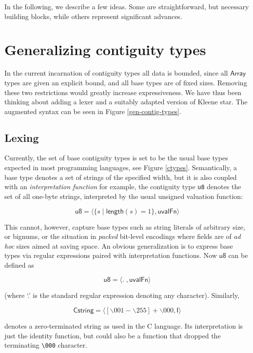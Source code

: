 \documentclass{article}
\newcommand{\konst}[1]{\ensuremath{\mathsf{#1}}}
\newcommand{\set}[1]{\ensuremath{\{ {#1} \}}}
\theoremstyle{definition}
\begin{document}
In the following, we describe a few ideas. Some are straightforward,
but necessary building blocks, while others represent significant
advances.

\section{Generalizing contiguity types}

In the current incarnation of contiguity types all data is bounded,
since all \konst{Array} types are given an explicit bound, and all
base types are of fixed sizes. Removing these two restrictions would
greatly increase expressiveness. We have thus been thinking about
adding a lexer and a suitably adapted version of Kleene star. The
augmented syntax can be seen in Figure \ref{gen-contig-types}.

\subsection{Lexing}

Currently, the set of base contiguity types is set to be the usual
base types expected in most programming languages, see Figure
\ref{ctypes}. Semantically, a base type denotes a set of strings of
the specified width, but it is also coupled with an
\emph{interpretation function} for example, the contiguity type
\verb+u8+ denotes the set of all one-byte strings, interpreted by the
usual unsigned valuation function:

  \[ \konst{u8} = \langle \set{s \mid \konst{length}(s) = 1}, \konst{uvalFn} \rangle
  \]

  This cannot, however, capture base types such as string literals of
  arbitrary size, or bignums, or the situation in \emph{packed}
  bit-level encodings where fields are of \emph{ad hoc} sizes aimed at
  saving space. An obvious generalization is to express base types via
  regular expressions paired with interpretation functions. Now \konst{u8}
  can be defined as

  \[ \konst{u8} = \langle . \; , \konst{uvalFn} \rangle
  \]

\noindent (where `.' is the standard regular expression denoting any character). Similarly,

  \[ \konst{Cstring} = \langle [\backslash 001-\backslash 255]+ \backslash 000, \konst{I} \rangle
  \]

\noindent denotes a zero-terminated string as used in the C
language. Its interpretation is just the identity function, but could
also be a function that dropped the terminating \verb+\000+ character.
\end{document}

